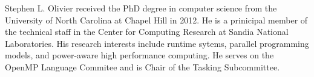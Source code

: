 \begin{IEEEbiography}{Stephen L. Olivier}
received the PhD degree in computer science from the
University of North Carolina at Chapel Hill in 2012. 
He is a prinicipal member of the technical staff in 
the Center for Computing Research at Sandia National 
Laboratories. His research interests include runtime 
sytems, parallel programming models, and power-aware 
high performance computing. 
He serves on the OpenMP Language Commitee and is 
 Chair of the Tasking Subcommittee.
\end{IEEEbiography}

